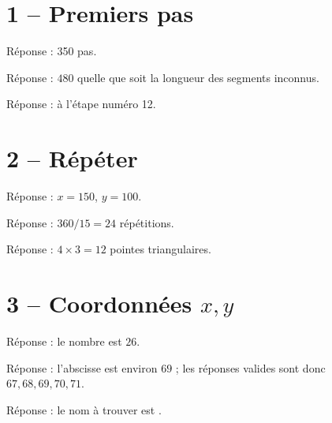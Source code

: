 \documentclass[class=report,crop=false, 12pt]{standalone}
\begin{document}


\section*{1 -- Premiers pas}

\begin{enigme}
Réponse : 350 pas.
\end{enigme}

\begin{enigme}
Réponse : $480$ quelle que soit la longueur des segments inconnus.
\end{enigme}

\begin{enigme}
Réponse : à l'étape numéro 12.
\end{enigme}


\section*{2 -- Répéter}

\setcounter{enigme}{0}

\begin{enigme}
Réponse : $x=150$, $y = 100$.
\end{enigme}

\begin{enigme}
Réponse : $360/15 = 24$ répétitions.
\end{enigme}

\begin{enigme}
Réponse : $4 \times 3 = 12$ pointes triangulaires.
\end{enigme}


\section*{3 -- Coordonnées $x,y$}

\setcounter{enigme}{0}

\begin{enigme}
Réponse : le nombre est $26$.
\end{enigme}

\begin{enigme}
Réponse : l'abscisse est environ $69$ ; les réponses valides sont donc $67,68,69,70,71$.
\end{enigme}

\begin{enigme}
Réponse : le nom à trouver est .
\end{enigme}
\end{document}
